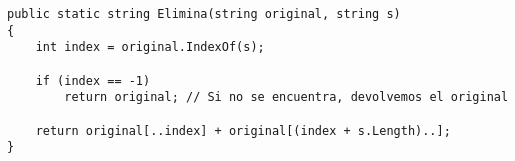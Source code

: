 \begin{lstlisting}
public static string Elimina(string original, string s)
{
    int index = original.IndexOf(s);
    
    if (index == -1) 
        return original; // Si no se encuentra, devolvemos el original
        
    return original[..index] + original[(index + s.Length)..];
}  
\end{lstlisting}